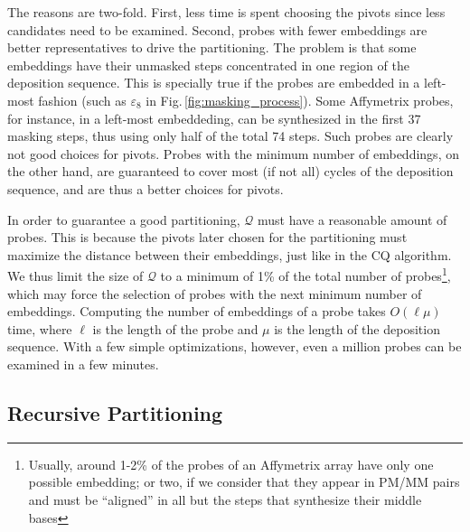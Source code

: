 \documentclass[runningheads]{llncs}
\begin{document}
The reasons are two-fold. First, less time is spent choosing the pivots
since less candidates need to be examined.
Second, probes with fewer embeddings are better representatives to drive
the partitioning. The problem is that some embeddings have their unmasked steps
concentrated in one region of the deposition sequence. This is specially true if
the probes are embedded in a left-most fashion (such as $\varepsilon_8$ in
Fig.\,\ref{fig:masking_process}). Some Affymetrix probes, for instance, in a
left-most embeddeding, can be synthesized in the first 37 masking steps, thus
using only half of the total 74 steps. Such probes are clearly not good choices
for pivots. Probes with the minimum number of embeddings, on the other hand,
are guaranteed to cover most (if not all) cycles of the deposition sequence,
and are thus a better choices for pivots.

In order to guarantee a good partitioning, $\mathcal{Q}$ must have a reasonable
amount of probes. This is because the pivots later chosen for the partitioning
must maximize the distance between their embeddings, just like in the CQ
algorithm. We thus limit the size of $\mathcal{Q}$ to a minimum of 1\% of the total
number of probes\footnote{Usually, around 1-2\% of the probes of an Affymetrix array
have only one possible embedding; or two, if we consider that they appear in PM/MM
pairs and must be ``aligned'' in all but the steps that synthesize their middle
bases}, which may force the selection of probes with the next minimum
number of embeddings.
Computing the number of embeddings of a probe takes $O(\ell \mu)$ time, where
$\ell$ is the length of the probe and $\mu$ is the length of the deposition sequence.
With a few simple optimizations, however, even a million probes can be examined in
a few minutes.

\subsection{Recursive Partitioning}
\end{document}
